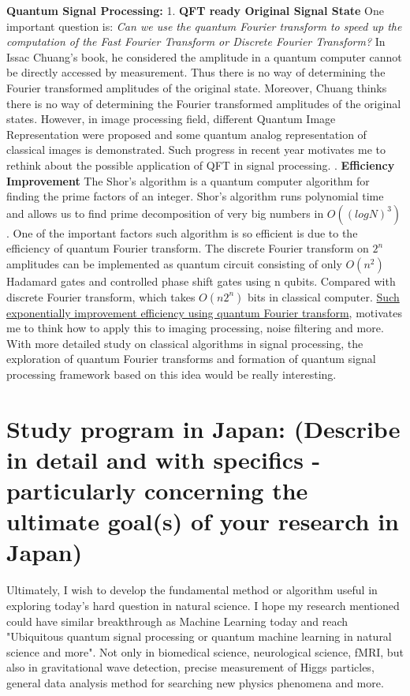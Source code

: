 \documentclass{article}
\begin{document}
\textbf{Quantum Signal Processing:} 
1. \textbf{QFT ready Original Signal State } One important question is:
\textit{
Can we use the quantum Fourier transform to speed up the 
computation of the Fast Fourier Transform or Discrete Fourier Transform?} 
In Issac Chuang's book, he considered the amplitude in a quantum 
computer cannot be directly accessed by measurement. Thus there is 
no way of determining the Fourier transformed amplitudes of the original 
state. Moreover, Chuang thinks there is no way of determining the Fourier transformed 
amplitudes of the original states. However, in image processing field, 
different Quantum Image Representation were proposed and some quantum analog 
representation of classical images is demonstrated. Such progress in recent 
year motivates me to rethink about the possible application of QFT in 
signal processing.   . \textbf{Efficiency Improvement} The Shor's algorithm is a 
quantum computer algorithm for finding the prime factors of an integer. 
Shor's algorithm runs polynomial time and allows us to find prime decomposition of very big 
numbers in $O ((log N)^3)$. One of the important factors such algorithm is so efficient is 
due to the efficiency of quantum Fourier transform. The discrete Fourier transform on 
$2^n$ amplitudes can be implemented as quantum circuit consisting of only $O(n^2)$ Hadamard gates
and controlled phase shift gates using n qubits. Compared with discrete Fourier transform, 
which takes $O(n 2^n )$ bits in classical computer. \underline{Such exponentially improvement 
efficiency using quantum Fourier transform}, motivates me to think how to apply this 
to imaging processing, noise filtering and more. With more detailed study on 
classical algorithms in signal processing, the exploration of quantum 
Fourier transforms and formation of quantum signal processing framework based on 
this idea would be really interesting. 


\section{Study program in Japan:
(Describe in detail and with specifics - particularly
concerning the ultimate goal(s) of your research in Japan)
}

Ultimately, I wish to develop the fundamental method or 
algorithm useful in exploring today's 
hard question in natural science. I hope my research mentioned 
could have similar breakthrough as Machine Learning today and 
reach "Ubiquitous quantum signal processing or 
quantum machine learning in natural science and more". 
Not only in biomedical science, 
neurological science, fMRI, but also in gravitational 
wave detection, precise measurement of Higgs particles, general 
data analysis method for searching new physics phenomena and more. 
\end{document}
